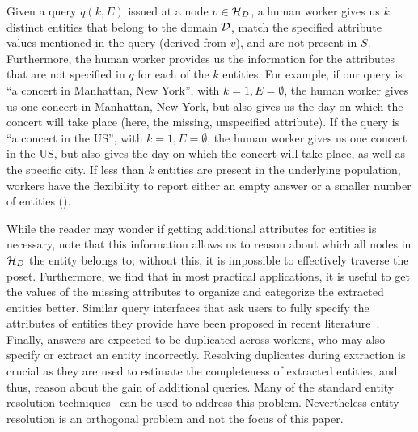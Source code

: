  Given a query $q(k, E)$ issued at a node $v \in \mathcal{H}_D$, a human worker gives us $k$ distinct entities that belong to the domain $\mathcal{D}$, match the specified attribute values mentioned in the query (derived from $v$), and are not present in $S$. Furthermore, the human worker provides us the information for the attributes that are not specified in $q$ for each of the $k$ entities. For example, if our query is ``a concert in Manhattan, New York'', with $k = 1, E = \emptyset$, the human worker gives us one concert in Manhattan, New York, but also gives us the day on which the concert will take place (here, the missing, unspecified attribute). If the query is ``a concert in the US'', with $k = 1, E = \emptyset$, the human worker gives us one concert in the US, but also gives the day on which the concert will take place, as well as the specific city. If less than $k$ entities are present in the underlying population, workers have the flexibility to report either an empty answer or a smaller number of entities ().

While the reader may wonder if getting additional attributes for entities is necessary, note that this information allows us to reason about which all nodes in $\mathcal{H}_D$ the entity belongs to; without this, it is impossible to effectively traverse the poset. Furthermore, we find that in most practical applications, it is useful to get the values of the missing attributes to organize and categorize the extracted entities better. Similar query interfaces that ask users to fully specify the attributes of entities they provide have been proposed in recent literature~\cite{quinn:2014}. \ifpaper Finally, answers are expected to be duplicated across workers, who may also specify or extract an entity incorrectly. Resolving duplicates during extraction is crucial as they are used to estimate the completeness of extracted entities, and thus, reason about the gain of additional queries. Many of the standard entity resolution techniques~\cite{getoor:kdd13} can be used to address this problem. Nevertheless entity resolution is an orthogonal problem and not the focus of this paper. \fi

